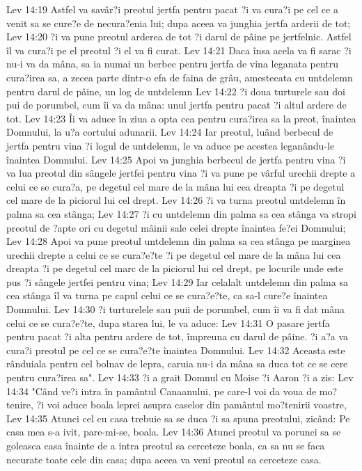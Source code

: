 Lev 14:19  Astfel va savâr?i preotul jertfa pentru pacat ?i va cura?i pe cel ce a venit sa se cure?e de necura?enia lui; dupa aceea va junghia jertfa arderii de tot;
Lev 14:20  ?i va pune preotul arderea de tot ?i darul de pâine pe jertfelnic. Astfel îl va cura?i pe el preotul ?i el va fi curat.
Lev 14:21  Daca însa acela va fi sarac ?i nu-i va da mâna, sa ia numai un berbec pentru jertfa de vina leganata pentru cura?irea sa, a zecea parte dintr-o efa de faina de grâu, amestecata cu untdelemn pentru darul de pâine, un log de untdelemn
Lev 14:22  ?i doua turturele sau doi pui de porumbel, cum îi va da mâna: unul jertfa pentru pacat ?i altul ardere de tot.
Lev 14:23  Îi va aduce în ziua a opta cea pentru cura?irea sa la preot, înaintea Domnului, la u?a cortului adunarii.
Lev 14:24  Iar preotul, luând berbecul de jertfa pentru vina ?i logul de untdelemn, le va aduce pe acestea leganându-le înaintea Domnului.
Lev 14:25  Apoi va junghia berbecul de jertfa pentru vina ?i va lua preotul din sângele jertfei pentru vina ?i va pune pe vârful urechii drepte a celui ce se cura?a, pe degetul cel mare de la mâna lui cea dreapta ?i pe degetul cel mare de la piciorul lui cel drept.
Lev 14:26  ?i va turna preotul untdelemn în palma sa cea stânga;
Lev 14:27  ?i cu untdelemn din palma sa cea stânga va stropi preotul de ?apte ori cu degetul mâinii sale celei drepte înaintea fe?ei Domnului;
Lev 14:28  Apoi va pune preotul untdelemn din palma sa cea stânga pe marginea urechii drepte a celui ce se cura?e?te ?i pe degetul cel mare de la mâna lui cea dreapta ?i pe degetul cel marc de la piciorul lui cel drept, pe locurile unde este pus ?i sângele jertfei pentru vina;
Lev 14:29  Iar celalalt untdelemn din palma sa cea stânga îl va turna pe capul celui ce se cura?e?te, ca sa-l cure?e înaintea Domnului.
Lev 14:30  ?i turturelele sau puii de porumbel, cum îi va fi dat mâna celui ce se cura?e?te, dupa starea lui, le va aduce:
Lev 14:31  O pasare jertfa pentru pacat ?i alta pentru ardere de tot, împreuna cu darul de pâine. ?i a?a va cura?i preotul pe cel ce se cura?e?te înaintea Domnului.
Lev 14:32  Aceasta este rânduiala pentru cel bolnav de lepra, caruia nu-i da mâna sa duca tot ce se cere pentru cura?irea sa".
Lev 14:33  ?i a grait Domnul cu Moise ?i Aaron ?i a zis:
Lev 14:34  "Când ve?i intra în pamântul Canaanului, pe care-l voi da voua de mo?tenire, ?i voi aduce boala leprei asupra caselor din pamântul mo?tenirii voastre,
Lev 14:35  Atunci cel cu casa trebuie sa se duca ?i sa spuna preotului, zicând: Pe casa mea s-a ivit, pare-mi-se, boala.
Lev 14:36  Atunci preotul va porunci sa se goleasca casa înainte de a intra preotul sa cerceteze boala, ca sa nu se faca necurate toate cele din casa; dupa aceea va veni preotul sa cerceteze casa.
